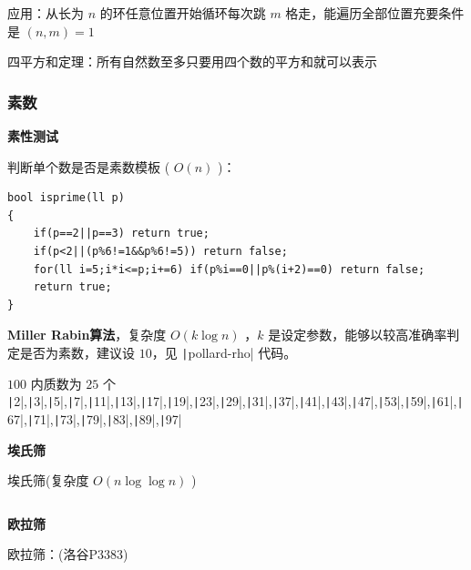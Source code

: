 \documentclass[twocolumn,10pt]{ctexart}
\makeatletter
\newcommand{\hfive}[1]{\par\addvspace{6pt}\@afterindentfalse
  {\noindent\bfseries\normalsize #1}\par\nobreak\vspace{2pt}}
\makeatother
\begin{document}
\begin{notebox}
应用：从长为 $n$ 的环任意位置开始循环每次跳 $m$ 格走，能遍历全部位置充要条件是 $(n,m)=1$

四平方和定理：所有自然数至多只要用四个数的平方和就可以表示
\end{notebox}

\subsubsection{素数}

\hfive{素性测试}

判断单个数是否是素数模板 ( $O(n)$ )：

\begin{verbatim}
bool isprime(ll p)
{
    if(p==2||p==3) return true;
    if(p<2||(p%6!=1&&p%6!=5)) return false;
    for(ll i=5;i*i<=p;i+=6) if(p%i==0||p%(i+2)==0) return false;
    return true;
}
\end{verbatim}

\textbf{Miller Rabin算法}，复杂度 $O(k\log n)$ ，$k$ 是设定参数，能够以较高准确率判定是否为素数，建议设 $10$，见 \texttt|pollard-rho| 代码。

\begin{notebox}
$100$ 内质数为  $25$ 个 \texttt|2|,\allowbreak \texttt|3|,\allowbreak \texttt|5|,\allowbreak \texttt|7|,\allowbreak \texttt|11|,\allowbreak \texttt|13|,\allowbreak \texttt|17|,\allowbreak \texttt|19|,\allowbreak \texttt|23|,\allowbreak \texttt|29|,\allowbreak \texttt|31|,\allowbreak \texttt|37|,\allowbreak \texttt|41|,\allowbreak \texttt|43|,\allowbreak \texttt|47|,\allowbreak \texttt|53|,\allowbreak \texttt|59|,\allowbreak \texttt|61|,\allowbreak \texttt|67|,\allowbreak \texttt|71|,\allowbreak \texttt|73|,\allowbreak \texttt|79|,\allowbreak \texttt|83|,\allowbreak \texttt|89|,\allowbreak \texttt|97|
\end{notebox}

\hfive{埃氏筛}

埃氏筛(复杂度 $O(n\log\log n)$ )

\inputminted{cpp}{code/ext_003.cpp}

\hfive{欧拉筛}

欧拉筛：(洛谷P3383)

\inputminted{cpp}{code/p3383_euler.cpp}
\end{document}
